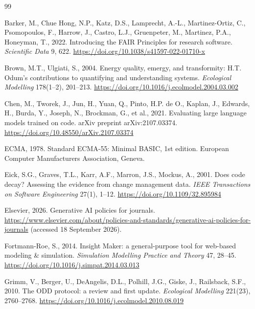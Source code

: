 \documentclass[3p,times,authoryear,twocolumn]{elsarticle}
\begin{document}
\begin{thebibliography}{99}

Barker, M., Chue Hong, N.P., Katz, D.S., Lamprecht, A.-L., Martinez-Ortiz, C., Psomopoulos, F., Harrow, J., Castro, L.J., Gruenpeter, M., Martinez, P.A., Honeyman, T., 2022. Introducing the FAIR Principles for research software. \emph{Scientific Data} 9, 622. \url{https://doi.org/10.1038/s41597-022-01710-x}

Brown, M.T., Ulgiati, S., 2004. Energy quality, emergy, and transformity: H.T. Odum's contributions to quantifying and understanding systems. \emph{Ecological Modelling} 178(1--2), 201--213. \url{https://doi.org/10.1016/j.ecolmodel.2004.03.002}

Chen, M., Tworek, J., Jun, H., Yuan, Q., Pinto, H.P. de O., Kaplan, J., Edwards, H., Burda, Y., Joseph, N., Brockman, G., et al., 2021. Evaluating large language models trained on code. arXiv preprint arXiv:2107.03374. \url{https://doi.org/10.48550/arXiv.2107.03374}

ECMA, 1978. Standard ECMA-55: Minimal BASIC, 1st edition. European Computer Manufacturers Association, Geneva.

Eick, S.G., Graves, T.L., Karr, A.F., Marron, J.S., Mockus, A., 2001. Does code decay? Assessing the evidence from change management data. \emph{IEEE Transactions on Software Engineering} 27(1), 1--12. \url{https://doi.org/10.1109/32.895984}

Elsevier, 2026. Generative AI policies for journals. \url{https://www.elsevier.com/about/policies-and-standards/generative-ai-policies-for-journals} (accessed 18 September 2026).

Fortmann-Roe, S., 2014. Insight Maker: a general-purpose tool for web-based modeling \& simulation. \emph{Simulation Modelling Practice and Theory} 47, 28--45. \url{https://doi.org/10.1016/j.simpat.2014.03.013}

Grimm, V., Berger, U., DeAngelis, D.L., Polhill, J.G., Giske, J., Railsback, S.F., 2010. The ODD protocol: a review and first update. \emph{Ecological Modelling} 221(23), 2760--2768. \url{https://doi.org/10.1016/j.ecolmodel.2010.08.019}


\end{thebibliography}
\end{document}
